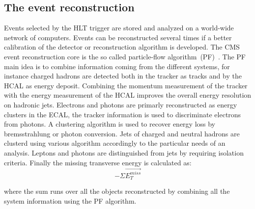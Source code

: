 \subsection{The event reconstruction}
Events selected by the HLT trigger are stored and analyzed on a world-wide network of computers.
Events can be reconstructed several times if a better calibration of the detector or reconstruction algorithm is
developed. The CMS event reconstruction core is the so called particle-flow algorithm~(PF)~\cite{PF}. The PF main idea
is to combine information coming from the different systems, for instance charged hadrons are detected both
in the tracker as tracks and by the HCAL as energy deposit. Combining the momentum measurement of the tracker
with the energy measurement of the HCAL improves the overall energy resolution on hadronic jets.
Electrons and photons are primarly reconstructed as energy clusters in the ECAL, the tracker information is
used to discriminate electrons from photons. A clustering algorithm is used to recover energy loss by bremsstrahlung
or photon conversion.
Jets of charged and neutral hadrons are clusterd using various algorithm accordingly to the particular needs of an analysis.
Leptons and photons are distinguished from jets by requiring isolation criteria.
Finally the missing transverse energy is calculated as:
\[
  -\Sigma \vec{E_T^{miss}}
\]

where the sum runs over all the objects reconstructed by combining all the system information using the PF algorithm.